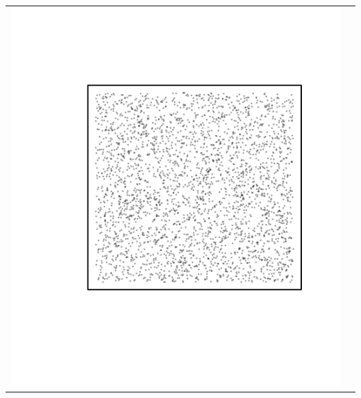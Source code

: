 \documentclass{article}\usepackage{graphicx, color}
\makeatletter
\def\maxwidth{ %
  \ifdim\Gin@nat@width>\linewidth
    \linewidth
  \else
    \Gin@nat@width
  \fi
}
\newenvironment{knitrout}{}{} %
\makeatother
\begin{document}
\vspace*{-1in}
\begin{tabular}{cc}
\begin{knitrout}
\definecolor{shadecolor}{rgb}{0.969, 0.969, 0.969}\color{fgcolor}\includegraphics[width=\maxwidth]{figure/unnamed-chunk-33} 
\end{knitrout}


\end{tabular}
\end{document}
